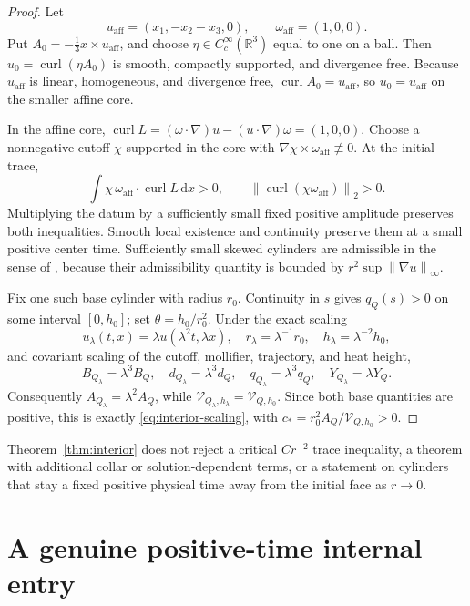 \documentclass[11pt]{article}
\theoremstyle{definition}
\newcommand{\curl}{\operatorname{curl}}
\newcommand{\norm}[1]{\left\lVert #1\right\rVert}
\newcommand{\dd}{\,\mathrm d}
\begin{document}
\begin{proof}
Let
\[
 u_{\mathrm{aff}}=(x_1,-x_2-x_3,0),
 \qquad \omega_{\mathrm{aff}}=(1,0,0).
\]
Put \(A_0=-\frac13x\times u_{\mathrm{aff}}\), and choose
\(\eta\in C_c^\infty(\mathbb R^3)\) equal to one on a ball.  Then
\(u_0=\curl(\eta A_0)\) is smooth, compactly supported, and divergence free.
Because \(u_{\mathrm{aff}}\) is linear, homogeneous, and divergence free,
\(\curl A_0=u_{\mathrm{aff}}\), so \(u_0=u_{\mathrm{aff}}\) on the smaller
affine core.

In the affine core,
\(\curl L=(\omega\cdot\nabla)u-(u\cdot\nabla)\omega=(1,0,0)\).
Choose a nonnegative cutoff \(\chi\) supported in the core with
\(\nabla\chi\times\omega_{\mathrm{aff}}\not\equiv0\).  At the initial trace,
\[
 \int\chi\,\omega_{\mathrm{aff}}\cdot\curl L\dd x>0,
 \qquad \norm{\curl(\chi\omega_{\mathrm{aff}})}_2>0.
\]
Multiplying the datum by a sufficiently small fixed positive amplitude
preserves both inequalities.  Smooth local existence and continuity preserve
them at a small positive center time.
Sufficiently small skewed cylinders are admissible in the sense of
\citet{Yang2020}, because their admissibility quantity is bounded by
\(r^2\sup\norm{\nabla u}_\infty\).

Fix one such base cylinder with radius \(r_0\).  Continuity in \(s\) gives
\(q_Q(s)>0\) on some interval \([0,h_0]\); set
\(\theta=h_0/r_0^2\).  Under the exact scaling
\[
 u_\lambda(t,x)=\lambda u(\lambda^2t,\lambda x),
 \quad r_\lambda=\lambda^{-1}r_0,
 \quad h_\lambda=\lambda^{-2}h_0,
\]
and covariant scaling of the cutoff, mollifier, trajectory, and heat height,
\[
 B_{Q_\lambda}=\lambda^3B_Q,\quad
 d_{Q_\lambda}=\lambda^3d_Q,\quad
 q_{Q_\lambda}=\lambda^3q_Q,\quad
 Y_{Q_\lambda}=\lambda Y_Q.
\]
Consequently \(A_{Q_\lambda}=\lambda^2A_Q\), while
\(\mathcal V_{Q_\lambda,h_\lambda}=\mathcal V_{Q,h_0}\).  Since both base
quantities are positive, this is exactly \eqref{eq:interior-scaling}, with
\(c_*=r_0^2A_Q/\mathcal V_{Q,h_0}>0\).
\end{proof}

Theorem~\ref{thm:interior} does not reject a critical \(Cr^{-2}\) trace
inequality, a theorem with additional collar or solution-dependent terms, or
a statement on cylinders that stay a fixed positive physical time away from
the initial face as \(r\to0\).

\section{A genuine positive-time internal entry}\label{sec:entry}
\end{document}
